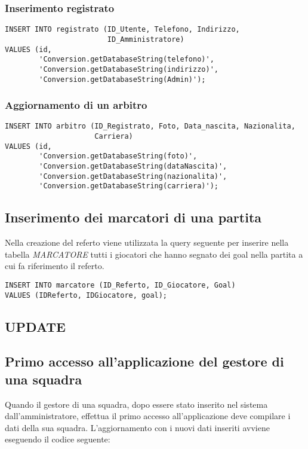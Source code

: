 \newpage

\subsubsection*{Inserimento registrato}

\begin{lstlisting}
INSERT INTO registrato (ID_Utente, Telefono, Indirizzo,
                        ID_Amministratore)
VALUES (id,
        'Conversion.getDatabaseString(telefono)',
        'Conversion.getDatabaseString(indirizzo)',
        'Conversion.getDatabaseString(Admin)');
\end{lstlisting}

\subsubsection*{Aggiornamento di un arbitro}

\begin{lstlisting}
INSERT INTO arbitro (ID_Registrato, Foto, Data_nascita, Nazionalita,
                     Carriera)
VALUES (id,
        'Conversion.getDatabaseString(foto)',
        'Conversion.getDatabaseString(dataNascita)',
        'Conversion.getDatabaseString(nazionalita)',
        'Conversion.getDatabaseString(carriera)');
\end{lstlisting}

\subsection*{Inserimento dei marcatori di una partita}
Nella creazione del referto viene utilizzata la query seguente per inserire nella tabella \emph{MARCATORE} tutti i giocatori che hanno segnato dei goal nella partita a cui fa riferimento il referto.

\begin{lstlisting}
INSERT INTO marcatore (ID_Referto, ID_Giocatore, Goal)
VALUES (IDReferto, IDGiocatore, goal);
\end{lstlisting}

\subsection{UPDATE}

\subsection*{Primo accesso all'applicazione del gestore di una squadra}
Quando il gestore di una squadra, dopo essere stato inserito nel sistema dall'amministratore, effettua il primo accesso all'applicazione deve compilare i dati della sua squadra. L'aggiornamento con i nuovi dati inseriti avviene eseguendo il codice seguente:

